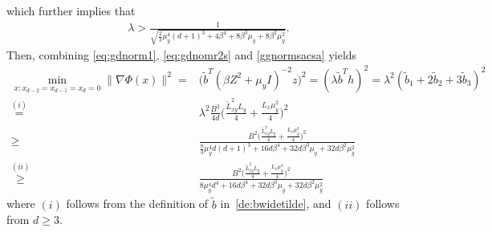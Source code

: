 \documentclass{osudissert96}
\begin{document}
which further implies that 
\begin{align}\label{ggnormsacsa}
\lambda > \frac{1}{\sqrt{\frac{2}{3}\mu_y^4(d+1)^3 +4\beta^4+8\beta^3\mu_y+8\beta^2\mu_y^2}}.
\end{align}
Then, combining \cref{eq:gdnorm1}, \cref{eq:gdnomr2s} and \cref{ggnormsacsa} yields
\begin{align}\label{min_gdnorm}
\min_{x: x_{d-2}=x_{d-1}=x_d=0} \|\nabla\Phi(x)\|^2 =&\big(\widetilde b^T (\beta Z^2 +\mu_y I)^{-2} z\big)^2 = (\lambda \widetilde b^T h)^2 = \lambda^2 (\widetilde b_1 + 2\widetilde b_2+3\widetilde b_3)^2 \nonumber
\\\overset{(i)}=& \lambda^2 \frac {B^2}{4d}\Big(\frac{\widetilde L^2_{xy}L_y}{4}+\frac{L_x\mu_y^2}{4}\Big)^2 \nonumber
\\ \geq& \frac{B^2\Big(\frac{\widetilde L^2_{xy}L_y}{4}+\frac{L_x\mu_y^2}{4}\Big)^2}{\frac{8}{3}\mu_y^4d(d+1)^3 +16d\beta^4+32d\beta^3\mu_y+32d\beta^2\mu_y^2} \nonumber
\\\overset{(ii)}\geq &  \frac{B^2\Big(\frac{\widetilde L^2_{xy}L_y}{4}+\frac{L_x\mu_y^2}{4}\Big)^2}{8\mu_y^4d^4 +16d\beta^4+32d\beta^3\mu_y+32d\beta^2\mu_y^2}
\end{align}
where $(i)$ follows from the definition of $\widetilde b$ in~\cref{de:bwidetilde}, and $(ii)$ follows from $d\geq 3$. 

\vspace{0.2cm}
\vspace{0.2cm}
\end{document}
